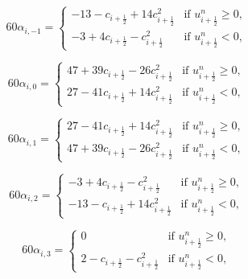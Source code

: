 \begin{equation*}
	60\alpha_{i,-1} =  
    	\begin{cases}
		-13 - c_{i+\frac{1}{2}}  + 14c_{i+\frac{1}{2}}^2 
		& \text{if } u_{i+\frac{1}{2}}^n \geq 0,\\
		-3 +  4c_{i+\frac{1}{2}}   -   c_{i+\frac{1}{2}}^2 & \text{if } u_{i+\frac{1}{2}}^n<0,
    	\end{cases}
\end{equation*}

\begin{equation*}
	60\alpha_{i,0} =  
    	\begin{cases}
		47 + 39c_{i+\frac{1}{2}} - 26c_{i+\frac{1}{2}}^2 
		& \text{if } u_{i+\frac{1}{2}}^n \geq 0,\\
		27 - 41c_{i+\frac{1}{2}}  +  14c_{i+\frac{1}{2}}^2 & \text{if } u_{i+\frac{1}{2}}^n<0,
    	\end{cases}
\end{equation*}

\begin{equation*}
	60\alpha_{i,1} =  
    	\begin{cases}
		27 - 41c_{i+\frac{1}{2}} + 14c_{i+\frac{1}{2}}^2 & \text{if } u_{i+\frac{1}{2}}^n \geq 0,\\
		47 + 39c_{i+\frac{1}{2}} - 26c_{i+\frac{1}{2}}^2 & \text{if } u_{i+\frac{1}{2}}^n<0,
    	\end{cases}
\end{equation*}

\begin{equation*}
	60\alpha_{i,2} =  
    	\begin{cases}
		-3 +  4c_{i+\frac{1}{2}} - c_{i+\frac{1}{2}}^2 
		& \text{if } u_{i+\frac{1}{2}}^n \geq 0,\\
		-13 - c_{i+\frac{1}{2}} +  14c_{i+\frac{1}{2}}^2 & \text{if } u_{i+\frac{1}{2}}^n<0,
    	\end{cases}
\end{equation*}

\begin{equation*}
	60\alpha_{i,3} =  
    	\begin{cases}
		0 & \text{if } u_{i+\frac{1}{2}}^n \geq 0,\\
		2-c_{i+\frac{1}{2}}-   c_{i+\frac{1}{2}}^2 & \text{if } u_{i+\frac{1}{2}}^n<0,
    	\end{cases}
\end{equation*}


